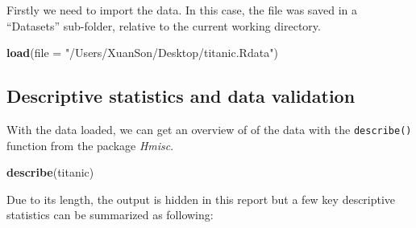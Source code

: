 \documentclass[12,]{article}
\newenvironment{Shaded}{\begin{snugshade}}{\end{snugshade}}
\newcommand{\KeywordTok}[1]{\textcolor[rgb]{0.13,0.29,0.53}{\textbf{#1}}}
\newcommand{\DataTypeTok}[1]{\textcolor[rgb]{0.13,0.29,0.53}{#1}}
\newcommand{\StringTok}[1]{\textcolor[rgb]{0.31,0.60,0.02}{#1}}
\newcommand{\NormalTok}[1]{#1}
\begin{document}
Firstly we need to import the data. In this case, the file was saved in
a ``Datasets'' sub-folder, relative to the current working directory.

\begin{Shaded}
\begin{Highlighting}[]
\KeywordTok{load}\NormalTok{(}\DataTypeTok{file =} \StringTok{"/Users/XuanSon/Desktop/titanic.Rdata"}\NormalTok{)}
\end{Highlighting}
\end{Shaded}

\subsection{Descriptive statistics and data
validation}\label{descriptive-statistics-and-data-validation}

With the data loaded, we can get an overview of of the data with the
\texttt{describe()} function from the package \emph{Hmisc}.

\begin{Shaded}
\begin{Highlighting}[]
\KeywordTok{describe}\NormalTok{(titanic)}
\end{Highlighting}
\end{Shaded}

Due to its length, the output is hidden in this report but a few key
descriptive statistics can be summarized as following:
\end{document}
